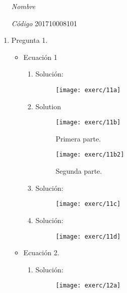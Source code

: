 \documentclass[fleqn]{article}
\begin{document}
 \vspace{0.3cm}
   \begin{itemize}[leftmargin=6.25cm, labelsep=0.5cm]

     \item[\textit{Nombre}] \scalebox{1.2}{Juan Sebastián Cárdenas Rodríguez} %
     \item[\textit{Código}] 201710008101 %

   \end{itemize}
\vspace{0.3cm}

\begin{enumerate}
\item Pregunta 1.
  \begin{itemize}
  \item Ecuación 1
    \begin{enumerate}[label=\alph*)]
    \item Solución:
      \begin{figure}[H]
        \centering
        \texttt{[image: exerc/11a]}
      \end{figure}
    \item Solution
      \begin{figure}[H]
        \centering
        \texttt{[image: exerc/11b]}
        \caption{Primera parte.}
      \end{figure}
      \begin{figure}[H]
        \centering
        \texttt{[image: exerc/11b2]}
        \caption{Segunda parte.}
      \end{figure}
    \item Solución:
      \begin{figure}[H]
        \centering
        \texttt{[image: exerc/11c]}
      \end{figure}
    \item Solución:
      \begin{figure}[H]
        \centering
        \texttt{[image: exerc/11d]}
      \end{figure}
    \end{enumerate}
  \item Ecuación 2.
    \begin{enumerate}[label=\alph*)]
    \item Solución:
      \begin{figure}[H]
        \centering
        \texttt{[image: exerc/12a]}

\end{figure}
\end{enumerate}
\end{itemize}
\end{enumerate}
\end{document}
